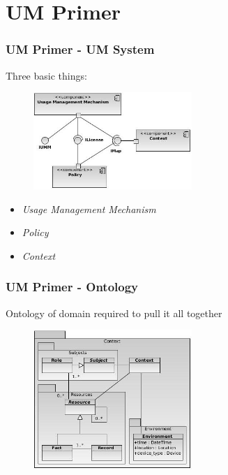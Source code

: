 \documentclass[t, 10pt]{beamer}
\begin{document}
\section{UM Primer}
\begin{frame}
\frametitle{UM Primer - UM System}

Three basic things:
\begin{figure}
\includegraphics[width = 6cm]{Integrated}
\end{figure}

\begin{itemize}
\item \textit{Usage Management Mechanism}
\item \textit{Policy}
\item \textit{Context}
\end{itemize}

\end{frame}

\begin{frame}
\frametitle{UM Primer - Ontology}

Ontology of domain required to pull it all together
\begin{figure}
\includegraphics[width = 6cm]{UMOntology}
\end{figure}

\end{frame}
\end{document}
